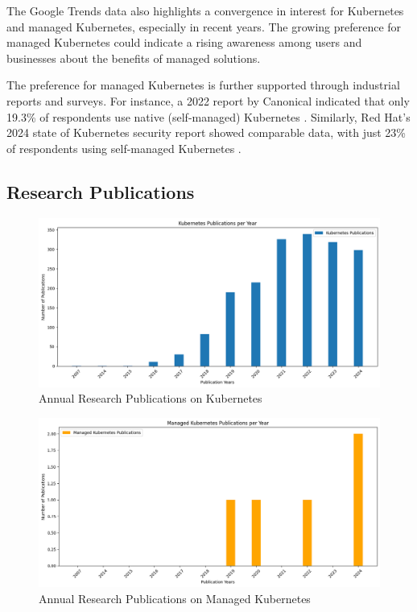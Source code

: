 The Google Trends data also highlights a convergence in interest for Kubernetes and managed Kubernetes, especially in recent years. The growing preference for managed Kubernetes could indicate a rising awareness among users and businesses about the benefits of managed solutions.

The preference for managed Kubernetes is further supported through industrial reports and surveys. For instance, a 2022 report by Canonical indicated that only 19.3\% of respondents use native (self-managed) Kubernetes \cite{canonicalKubernetesCloudNative2022}. Similarly, Red Hat's 2024 state of Kubernetes security report showed comparable data, with just 23\% of respondents using self-managed Kubernetes \cite{redhatinc.StateKubernetesSecurity2024}.

\subsection{Research Publications}

\FloatBarrier

\begin{figure}
    \centering
    \includegraphics[width=1\linewidth]{resources/publications-plot-k8s.png}
    \caption{Annual Research Publications on Kubernetes}
    \label{fig:research-publications-kubernetes-and-managed-kubernetes}
\end{figure}


\begin{figure}
    \centering
    \includegraphics[width=1\linewidth]{resources/publications-plot-managed-k8s.png}
    \caption{Annual Research Publications on Managed Kubernetes}
    \label{fig:research-publications-managed-kubernetes}
\end{figure}

